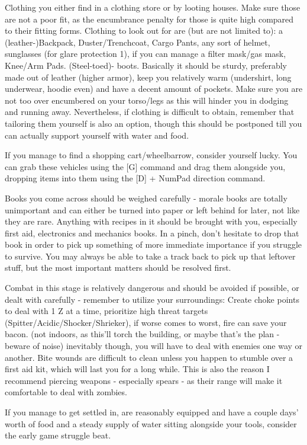 \documentclass[11pt]{report}
\begin{document}
Clothing you either find in a clothing store or by looting houses. Make sure those are not a poor fit, as the encumbrance penalty for those is quite high compared to their fitting forms. Clothing to look out for are (but are not limited to): a (leather-)Backpack, Duster/Trenchcoat, Cargo Pants, any sort of helmet, sunglasses (for glare protection 1), if you can manage a filter mask/gas mask, Knee/Arm Pads. (Steel-toed)- boots. Basically it should be sturdy, preferably made out of leather (higher armor), keep you relatively warm (undershirt, long underwear, hoodie even) and have a decent amount of pockets. Make sure you are not too over encumbered on your torso/legs as this will hinder you in dodging and running away. Nevertheless, if clothing is difficult to obtain, remember that tailoring them yourself is also an option, though this should be postponed till you can actually support yourself with water and food.

If you manage to find a shopping cart/wheelbarrow, consider yourself lucky. You can grab these vehicles using the [G] command and drag them alongside you, dropping items into them using the [D] + NumPad direction command.

Books you come across should be weighed carefully - morale books are totally unimportant and can either be turned into paper or left behind for later, not like they are rare. Anything with recipes in it should be brought with you, especially first aid, electronics and mechanics books. In a pinch, don't hesitate to drop that book in order to pick up something of more immediate importance if you struggle to survive. You may always be able to take a track back to pick up that leftover stuff, but the most important matters should be resolved first.

Combat in this stage is relatively dangerous and should be avoided if possible, or dealt with carefully - remember to utilize your surroundings: Create choke points to deal with 1 Z at a time, prioritize high threat targets (Spitter/Acidic/Shocker/Shrieker), if worse comes to worst, fire can save your bacon. (not indoors, as this'll torch the building, or maybe that's the plan - beware of noise) inevitably though, you will have to deal with enemies one way or another. Bite wounds are difficult to clean unless you happen to stumble over a first aid kit, which will last you for a long while. This is also the reason I recommend piercing weapons - especially spears - as their range will make it comfortable to deal with zombies.

If you manage to get settled in, are reasonably equipped and have a couple days' worth of food and a steady supply of water sitting alongside your tools, consider the early game struggle beat.
\end{document}
